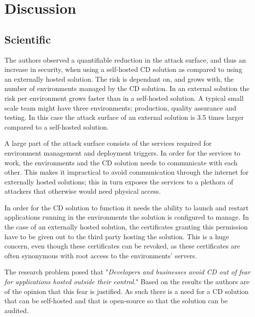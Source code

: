 \chapter{Discussion}
\label{chap:discussion}

\section{Scientific}
The authors observed a quantifiable reduction in the attack surface, and thus an increase in security, when using a self-hosted \acrshort{CD} solution as compared to using an externally hosted solution. The risk is dependant on, and grows with, the number of environments managed by the \acrshort{CD} solution. In an external solution the risk per environment grows faster than in a self-hosted solution. A typical small scale team might have three environments; production, quality assurance and testing. In this case the attack surface of an external solution is 3.5 times larger compared to a self-hosted solution.

A large part of the attack surface consists of the services required for environment management and deployment triggers. In order for the services to work, the environments and the \acrshort{CD} solution needs to communicate with each other. This makes it impractical to avoid communication through the internet for externally hosted solutions; this in turn exposes the services to a plethora of attackers that otherwise would need physical access.

In order for the \acrshort{CD} solution to function it needs the ability to launch and restart applications running in the environments the solution is configured to manage. In the case of an externally hosted solution, the certificates granting this permission have to be given out to the third party hosting the solution. This is a huge concern, even though these certificates can be revoked, as these certificates are often synonymous with root access to the environments' servers.

The research problem posed that "\textit{Developers and businesses avoid \acrshort{CD} out of fear for applications hosted outside their control.}" Based on the results the authors are of the opinion that this fear is justified. As such there is a need for a \acrshort{CD} solution that can be self-hosted and that is open-source so that the solution can be audited.

